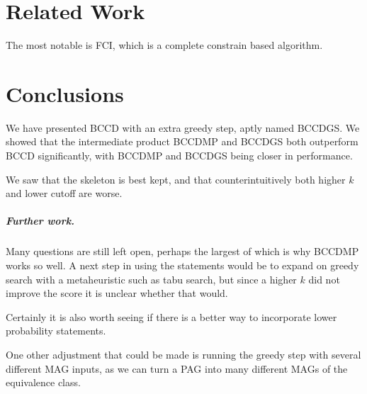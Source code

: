 \documentclass[11pt,a4paper]{report}
\begin{document}
\chapter{Related Work}\label{relatedwork}
The most notable is
FCI\cite{spirtesCausationPredictionSearch2000}, which is a complete
\cite{zhangCompletenessOrientationRules2008} constrain based algorithm.


\chapter{Conclusions}\label{conclusions}
We have presented BCCD with an extra greedy step, aptly named BCCDGS. We
showed that the intermediate product BCCDMP and BCCDGS both outperform
BCCD significantly, with BCCDMP and BCCDGS being closer in performance.

We saw that the skeleton is best kept, and that counterintuitively both
higher $k$ and lower cutoff are worse.

\paragraph{Further work.}
Many questions are still left open, perhaps the largest of which is why
BCCDMP works so well. A next step in using the statements would be to
expand on greedy search with a metaheuristic such as tabu search, but
since a higher $k$ did not improve the score it is unclear whether that
would.

Certainly it is also worth seeing if there is a better way to incorporate
lower probability statements.

One other adjustment that could be made is running the greedy step with
several different MAG inputs, as we can turn a PAG into many different
MAGs of the equivalence class.

\printbibliography


\end{document}
